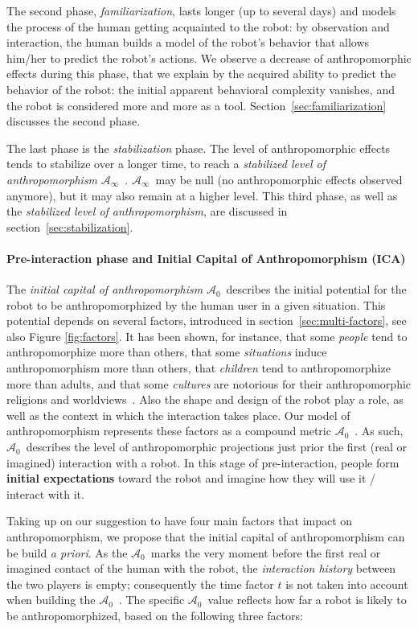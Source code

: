 \documentclass{frontiersSCNS} %
\newcommand{\ICA}{{$\mathcal{A}_0$~}}
\newcommand{\SLA}{{$\mathcal{A}_\infty$~}}
\begin{document}
The second phase, \emph{familiarization}, lasts longer (up to several days) and
models the process of the human getting acquainted to the robot: by observation
and interaction, the human builds a model of the robot's behavior that allows
him/her to predict the robot's actions. We observe a decrease of
anthropomorphic effects during this phase, that we explain by the acquired
ability to predict the behavior of the robot: the initial apparent behavioral
complexity vanishes, and the robot is considered more and more as a tool.
Section~\ref{sec:familiarization} discusses the second phase.

The last phase is the \emph{stabilization} phase. The level of anthropomorphic
effects tends to stabilize over a longer time, to reach a \emph{stabilized
level of anthropomorphism} \SLA. \SLA may be null (no anthropomorphic
effects observed anymore), but it may also remain at a higher level.  This
third phase, as well as the \emph{stabilized level of anthropomorphism}, are
discussed in section~\ref{sec:stabilization}.


\paragraph{Pre-interaction phase and Initial Capital of Anthropomorphism (ICA)\\}
\label{sec:ica}

The \emph{initial capital of anthropomorphism} \ICA describes the initial
potential for the robot to be anthropomorphized by the human user in a given
situation.  This potential depends on several factors, introduced in
section~\ref{sec:multi-factors}, see also Figure \ref{fig:factors}. It has been
shown, for instance, that some \textit{people} tend to anthropomorphize more
than others, that some \textit{situations} induce anthropomorphism more than
others, that \textit{children} tend to anthropomorphize more than adults, and
that some \textit{cultures} are notorious for their anthropomorphic religions
and worldviews~\citep{epley_when_2008}. Also the shape and design of the robot
play a role, as well as the context in which the interaction takes place. Our
model of anthropomorphism represents these factors as a compound metric \ICA. As
such, \ICA describes the level of anthropomorphic projections just prior the
first (real or imagined) interaction with a robot. In this stage of
pre-interaction, people form \textbf{initial expectations} toward the robot and
imagine how they will use it / interact with it.

Taking up on our suggestion to have four main factors that impact on
anthropomorphism, we propose that the initial capital of anthropomorphism can be
build \emph{a priori}.  As the \ICA marks the very moment before the first real
or imagined contact of the human with the robot, the \textit{interaction
history} between the two players is empty; consequently the time factor $t$ is
not taken into account when building the \ICA.  The specific \ICA value reflects
how far a robot is likely to be anthropomorphized, based on the following three
factors:
\end{document}

